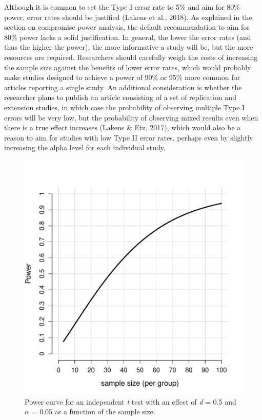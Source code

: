 \documentclass[
  english,
  ,jou,floatsintext]{apa6}
\begin{document}
Although it is common to set the Type I error rate to 5\% and aim for 80\% power, error rates should be justified (Lakens et al., 2018). As explained in the section on compromise power analysis, the default recommendation to aim for 80\% power lacks a solid justification. In general, the lower the error rates (and thus the higher the power), the more informative a study will be, but the more resources are required. Researchers should carefully weigh the costs of increasing the sample size against the benefits of lower error rates, which would probably make studies designed to achieve a power of 90\% or 95\% more common for articles reporting a single study. An additional consideration is whether the researcher plans to publish an article consisting of a set of replication and extension studies, in which case the probability of observing multiple Type I errors will be very low, but the probability of observing mixed results even when there is a true effect increases (Lakens \& Etz, 2017), which would also be a reason to aim for studies with low Type II error rates, perhaps even by slightly increasing the alpha level for each individual study.

\begin{figure}
\centering
\includegraphics{sample_size_justification_files/figure-latex/power-2-1.pdf}
\caption{\label{fig:power-2}Power curve for an independent \emph{t} test with an effect of \emph{d} = 0.5 and \(\alpha\) = 0.05 as a function of the sample size.}
\end{figure}
\end{document}
